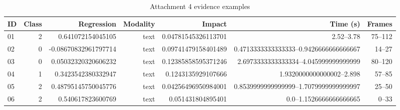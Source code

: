 \begin{table}[htbp]
\centering
\small
\caption{Attachment 4 evidence examples}
\label{tab:q3_evidence_examples}
\begin{tabular}{lrrrrrr}
\toprule
ID & Class & Regression & Modality & Impact & Time (s) & Frames \\
\midrule
01 & 2 & 0.641072154045105 & text & 0.04781545326113701 & 2.52--3.78 & 75--112 \\
02 & 0 & -0.08670832961797714 & text & 0.09741479158401489 & 0.4713333333333333--0.9426666666666667 & 14--27 \\
03 & 0 & 0.05032320320606232 & text & 0.12385858595371246 & 2.6973333333333334--4.045999999999999 & 80--120 \\
04 & 1 & 0.3423542380332947 & text & 0.1243135929107666 & 1.9320000000000002--2.898 & 57--85 \\
05 & 2 & 0.48795145750045776 & text & 0.04256496950984001 & 0.8539999999999999--1.7079999999999997 & 25--50 \\
06 & 2 & 0.540617823600769 & text & 0.051431804895401 & 0.0--1.1526666666666665 & 0--33 \\
\bottomrule
\end{tabular}
\end{table}
